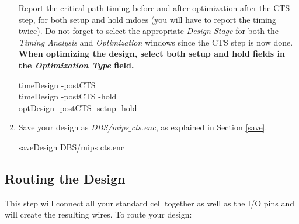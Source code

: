 \begin{enumerate}
\begin{exercise}
Report the critical path timing before and after optimization after the CTS step, for both setup and hold mdoes (you will have to report the timing twice). Do not forget to select the appropriate \textit{Design Stage} for both the \textit{Timing Analysis} and \textit{Optimization} windows since the CTS step is now done. \textbf{When optimizing the design, select both setup and hold fields in the \textit{Optimization Type} field.}

\begin{codeline}
timeDesign -postCTS \\
timeDesign -postCTS -hold \\
optDesign -postCTS -setup -hold
\end{codeline}


\end{exercise}
\item Save your design as \textit{DBS/mips$\_$cts.enc}, as explained in Section \ref{save}. 

\begin{codeline}
	saveDesign DBS/mips$\_$cts.enc
\end{codeline}
\end{enumerate}



\clearpage

\subsection{Routing the Design}
This step will connect all your standard cell together as well as the I/O pins and will create the resulting wires. To route your design:


